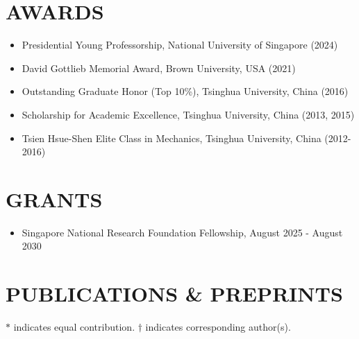 \documentclass[margin]{resphoto}
\begin{document}
\begin{resume}
\section{AWARDS}
\begin{itemize}[leftmargin=*]
\item Presidential Young Professorship, National University of Singapore (2024)
\item David Gottlieb Memorial Award, Brown University, USA (2021)
\item Outstanding Graduate Honor (Top 10\%), Tsinghua University, China (2016)
\item Scholarship for Academic Excellence, Tsinghua University, China (2013, 2015)
\item Tsien Hsue-Shen Elite Class in Mechanics, Tsinghua University, China (2012-2016)
\end{itemize}


\section{GRANTS}
\begin{itemize}[leftmargin=*]
\item Singapore National Research Foundation Fellowship, August 2025 - August 2030
\end{itemize}

\section{PUBLICATIONS \& PREPRINTS}
$*$ indicates equal contribution. $\dagger$ indicates corresponding author(s).




\end{resume}
\end{document}
